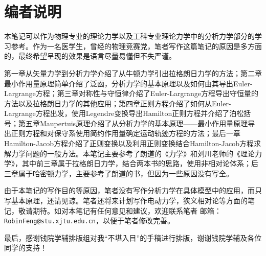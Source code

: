 \chapter*{编者说明}

本笔记可以作为物理专业的理论力学以及工科专业理论力学中的分析力学部分的学习参考。作为一名医学生，曾经的物理竞赛党，笔者写作这篇笔记的原因是多方面的，最终希望呈现的效果是语言尽量易懂但不失严谨。

第一章从矢量力学到分析力学介绍了从牛顿力学引出拉格朗日力学的方法；第二章最小作用量原理简单介绍了泛函，分析力学的基本原理以及如何由其导出Euler-Largrange方程；第三章对称性与守恒律介绍了Euler-Largrange方程导出守恒量的方法以及拉格朗日力学的其他应用；第四章正则方程介绍了如何从Euler-Largrange方程出发，使用Legendre变换导出Hamilton正则方程并介绍了泊松括号；第五章Maupertuis原理介绍了从分析力学的基本原理——最小作用量原理导出正则方程和对保守系使用简约作用量确定运动轨迹方程的方法；最后一章Hamilton-Jacob方程介绍了正则变换以及利用正则变换结合Hamilton-Jacob方程求解力学问题的一般方法。本笔记主要参考了朗道的《力学》和刘川老师的《理论力学》，其中前三章属于拉格朗日力学，结合两本书的思路，使用非相对论体系；后三章属于哈密顿力学，主要参考了朗道的书，但因为一些原因没有写全。

由于本笔记的写作目的等原因，笔者没有写作分析力学在具体模型中的应用，而只写基本原理，还请见谅。笔者还将来计划写作电动力学，狭义相对论等方面的笔记，敬请期待。如对本笔记有任何意见和建议，欢迎联系笔者 邮箱：\texttt{RobinFeng@stu.xjtu.edu.cn}，以便于笔者修改完善。

最后，感谢钱院学辅排版组对我“不堪入目”的手稿进行排版，谢谢钱院学辅及各位同学的支持！


\vspace{1em}
\makeatletter
\begin{flushright}
	\@author\\
	\@date
\end{flushright}
\makeatother


\cleardoublepage
\tableofcontents